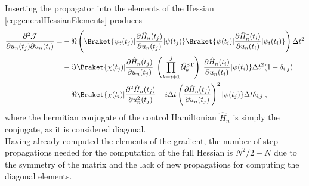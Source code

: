Inserting the propagator into the elements of the Hessian \eqref{eq:generalHessianElements} produces 
\begin{align}
	\frac{\partial^2 \mathcal{J}}{\partial u_n (t_j) \partial u_n (t_i)} =& - \Re \left( \Braket{\psi_t (t_j) | \frac{\partial \hat{H}_n  (t_j)}{\partial u_n (t_j)} | \psi (t_{j})} \Braket{\psi (t_{i}) | \frac{\partial \hat{H}_n ^* (t_i)}{\partial u_n (t_i)} | \psi_t (t_{i})} \right) \Delta t ^2 \nonumber \\
	&- \Im \Braket{\chi (t_j) | \frac{\partial \hat{H}_n  (t_j)}{\partial u_n (t_j)}  \; \left( \prod_{k = i+1}^{j} \hat{\mathcal{U}}_{k}^{\mathrm{ST}}  \right) \; \frac{\partial \hat{H}_n (t_i)}{\partial u_n (t_i)}  | \psi (t_{i})} \Delta t^ 2  ( 1 - \delta_{i , j}) \nonumber \\
	&- \Re \Braket{\chi (t_i) | \frac{\partial^2 \hat{H}_n (t_j)}{\partial u_n ^2 (t_j)} - i \Delta t \left( \frac{\partial \hat{H}_n (t_j)}{\partial u_n (t_j)} \right)^2 | \psi (t_j) } \Delta t \delta_{i,j} \; ,
	\label{eq:expandedHessianElements}
\end{align}
where the hermitian conjugate of the control Hamiltonian $\hat{H}_n$ is simply the conjugate, as it is considered diagonal. \\ 
Having already computed the elements of the gradient, the number of step-propagations needed for the computation of the full Hessian is $N^2 / 2 - N$ due to the symmetry of the matrix and the lack of new propagations for computing the diagonal elements.